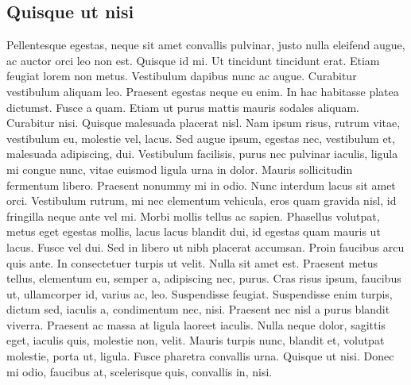  \subsection{Quisque ut nisi}
 Pellentesque egestas, neque sit amet convallis pulvinar, justo nulla eleifend augue, ac auctor orci leo non est. Quisque id mi. Ut tincidunt tincidunt erat. Etiam feugiat lorem non metus. Vestibulum dapibus nunc ac augue. Curabitur vestibulum aliquam leo. Praesent egestas neque eu enim. In hac habitasse platea dictumst. Fusce a quam. Etiam ut purus mattis mauris sodales aliquam. Curabitur nisi. Quisque malesuada placerat nisl. Nam ipsum risus, rutrum vitae, vestibulum eu, molestie vel, lacus. Sed augue ipsum, egestas nec, vestibulum et, malesuada adipiscing, dui. Vestibulum facilisis, purus nec pulvinar iaculis, ligula mi congue nunc, vitae euismod ligula urna in dolor. Mauris sollicitudin fermentum libero. Praesent nonummy mi in odio. Nunc interdum lacus sit amet orci. Vestibulum rutrum, mi nec elementum vehicula, eros quam gravida nisl, id fringilla neque ante vel mi. Morbi mollis tellus ac sapien. Phasellus volutpat, metus eget egestas mollis, lacus lacus blandit dui, id egestas quam mauris ut lacus. Fusce vel dui. Sed in libero ut nibh placerat accumsan. Proin faucibus arcu quis ante. In consectetuer turpis ut velit. Nulla sit amet est. Praesent metus tellus, elementum eu, semper a, adipiscing nec, purus. Cras risus ipsum, faucibus ut, ullamcorper id, varius ac, leo. Suspendisse feugiat. Suspendisse enim turpis, dictum sed, iaculis a, condimentum nec, nisi. Praesent nec nisl a purus blandit viverra. Praesent ac massa at ligula laoreet iaculis. Nulla neque dolor, sagittis eget, iaculis quis, molestie non, velit. Mauris turpis nunc, blandit et, volutpat molestie, porta ut, ligula. Fusce pharetra convallis urna. Quisque ut nisi. Donec mi odio, faucibus at, scelerisque quis, convallis in, nisi.

